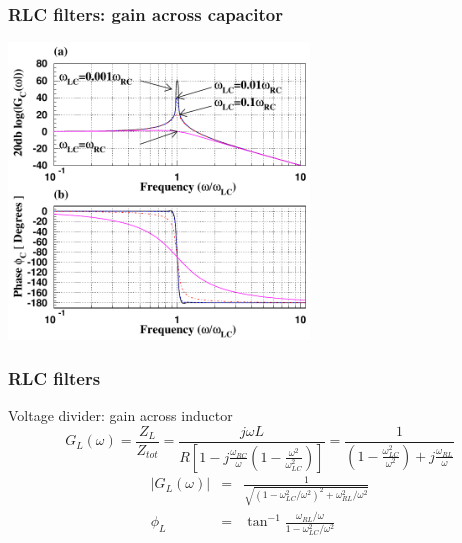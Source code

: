 \documentclass[beamer]{standalone}
\begin{document}
\begin{frame}
 \frametitle{RLC filters: gain across capacitor}
 \begin{center}
  \includegraphics[width=0.6\textwidth]{pics/RLC_bode_capacitor}
 \end{center}
\end{frame}

\begin{frame}
 \frametitle{RLC filters}
 \begin{block}{Voltage divider: gain across inductor}
  \begin{equation*}
   G_L(\omega) = \frac{Z_L}{Z_{tot}} = \frac{j\omega L}{R\left[ 1 - j\frac{\omega_{RC}}{\omega} \left( 1 - \frac{\omega^2}{\omega_{LC}^2} \right) \right]} = \frac{1}{\left( 1 - \frac{\omega^2_{LC}}{\omega^2} \right) + j\frac{\omega_{RL}}{\omega}}
  \end{equation*}
  \begin{eqnarray*}
   |G_L(\omega)| & = & \frac{1}{\sqrt{ \left(1 - \omega_{LC}^2/\omega^2 \right)^2 + \omega_{RL}^2/\omega^2}} \\
   \phi_L & = & \tan^{-1} \frac{\omega_{RL}/\omega}{1 - \omega_{LC}^2/\omega^2}
  \end{eqnarray*}
 \end{block}
\end{frame}
\end{document}
